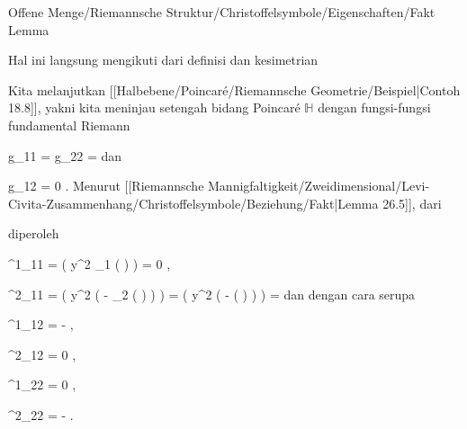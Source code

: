 {Offene Menge/Riemannsche Struktur/Christoffelsymbole/Eigenschaften/Fakt}
{Lemma}
{}
{

\faktfolgerung {}
\faktzusatz {}
\faktzusatz {}

}
{

Hal ini langsung mengikuti dari definisi dan kesimetrian

}

{

Kita melanjutkan
[[Halbebene/Poincaré/Riemannsche Geometrie/Beispiel|Contoh 18.8]],
yakni kita meninjau setengah bidang Poincaré $\mathbb H$ dengan fungsi-fungsi fundamental Riemann

\mavergleichskette
{\vergleichskette
{ g_{11}
}
{ = }{ g_{22}
}
{ = }{ {  }
}
{    }{
}
{   }{
}
}
{}{}{}
dan

\mavergleichskette
{\vergleichskette
{ g_{12}
}
{ = }{ 0
}
{  }{
}
{    }{
}
{   }{
}
}
{}{}{.}
Menurut
[[Riemannsche Mannigfaltigkeit/Zweidimensional/Levi-Civita-Zusammenhang/Christoffelsymbole/Beziehung/Fakt|Lemma 26.5]],
dari

 {  }

diperoleh

\mavergleichskettedisp
{\vergleichskette
{ \Gamma^1_{11}
}
{ =} { {  }  \left(  y^2  \partial_1  \left(  \right)     \right)
}
{ =} { 0
}
{ } {
}
{ } {}
}
{}{}{,}

\mavergleichskettedisp
{\vergleichskette
{ \Gamma^2_{11}
}
{ =} { {  }  \left(  y^2 \left(  - \partial_2  \left(  \right)  \right)      \right)
}
{ =} { {  }  \left(  y^2 \left(  -  \left(  \right)  \right)      \right)
}
{ =} { {  }
}
{ } {
}
}
{}{}{}
dan dengan cara serupa

\mavergleichskette
{\vergleichskette
{ \Gamma^1_{12}
}
{ = }{ - {  }
}
{  }{
}
{    }{
}
{   }{
}
}
{}{}{,}

\mavergleichskette
{\vergleichskette
{ \Gamma^2_{12}
}
{ = }{ 0
}
{  }{
}
{    }{
}
{   }{
}
}
{}{}{,}

\mavergleichskette
{\vergleichskette
{ \Gamma^1_{22}
}
{ = }{ 0
}
{  }{
}
{    }{
}
{   }{
}
}
{}{}{,}

\mavergleichskette
{\vergleichskette
{ \Gamma^2_{22}
}
{ = }{ - {  }
}
{  }{
}
{    }{
}
{   }{
}
}
{}{}{.}

}

